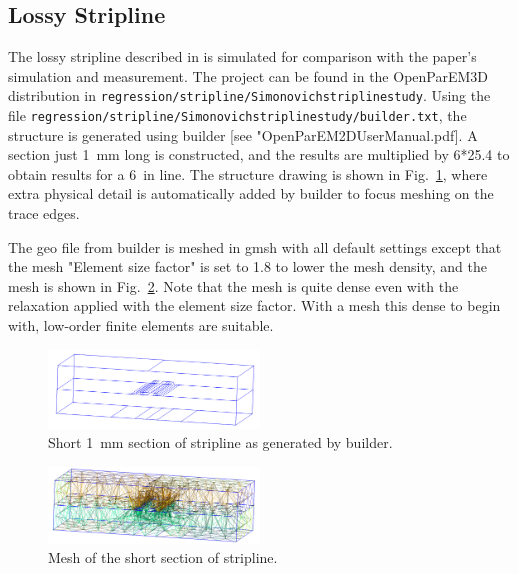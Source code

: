 \documentclass[titlepage]{article}
\renewcommand\_{\textunderscore\linebreak[1]}
\begin{document}
\subsection{Lossy Stripline}

The lossy stripline described in \cite{Simonovich} is simulated for comparison with the paper's simulation and measurement.
The project can be found in the OpenParEM3D distribution in \texttt{regression/stripline/Simonovich\_stripline\_study}.
Using the file \texttt{regression/stripline/Simonovich\_stripline\_study/builder.txt}, the structure is generated using builder [see "OpenParEM2D\_User\_Manual.pdf].
A section just 1~mm long is constructed, and the results are multiplied by 6*25.4 to obtain results for a 6~in line.
The structure drawing is shown in Fig.~\ref{fig:stripline_drawing}, where extra physical detail is automatically added by builder to focus meshing on the trace edges.

The geo file from builder is meshed in gmsh with all default settings except that the mesh "Element size factor" is set to 1.8 to lower the mesh density, and the mesh is shown in Fig.~\ref{fig:stripline_mesh}.  Note that the mesh is quite dense even with the relaxation applied with the element size factor.  With a mesh this dense to begin with, low-order finite elements are suitable.

\begin{figure}[H]
  \centering
  \includegraphics[width=0.5\textwidth]{../regression/OpenParEM3D/stripline/Simonovich_stripline_study/screenshots/stripline_drawing}
  \caption{Short 1~mm section of stripline as generated by builder.}
  \label{fig:stripline_drawing}
\end{figure}

\begin{figure}[H]
  \centering
  \includegraphics[width=0.5\textwidth]{../regression/OpenParEM3D/stripline/Simonovich_stripline_study/screenshots/stripline_mesh}
  \caption{Mesh of the short section of stripline.}
  \label{fig:stripline_mesh}
\end{figure}
\end{document}
